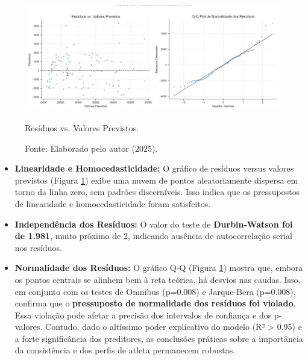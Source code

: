 \begin{figure}[H]
    \centering
    \begin{minipage}{1\textwidth}
        \centering
        \includegraphics[width=\linewidth]{Imagens/analise_residuos_modelo.png}
        \caption{Resíduos vs. Valores Previstos.}
        \label{fig:residuos}
    \end{minipage}\hfill
    \caption*{Fonte: Elaborado pelo autor (2025).}
\end{figure}

\begin{itemize}
    \item \textbf{Linearidade e Homocedasticidade:} O gráfico de resíduos versus valores previstos (Figura \ref{fig:residuos}) exibe uma nuvem de pontos aleatoriamente dispersa em torno da linha zero, sem padrões discerníveis. Isso indica que os pressupostos de linearidade e homocedasticidade foram satisfeitos.
    \item \textbf{Independência dos Resíduos:} O valor do teste de \textbf{Durbin-Watson foi de 1.981}, muito próximo de 2, indicando ausência de autocorrelação serial nos resíduos.
    \item \textbf{Normalidade dos Resíduos:} O gráfico Q-Q (Figura \ref{fig:residuos}) mostra que, embora os pontos centrais se alinhem bem à reta teórica, há desvios nas caudas. Isso, em conjunto com os testes de Omnibus (p=0.008) e Jarque-Bera (p=0.008), confirma que o \textbf{pressuposto de normalidade dos resíduos foi violado}. Essa violação pode afetar a precisão dos intervalos de confiança e dos p-valores. Contudo, dado o altíssimo poder explicativo do modelo (R² > 0.95) e a forte significância dos preditores, as conclusões práticas sobre a importância da consistência e dos perfis de atleta permanecem robustas.
\end{itemize}
